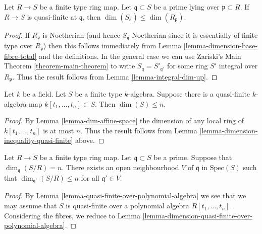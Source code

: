 \begin{lemma}
\label{lemma-dimension-inequality-quasi-finite}
Let $R \to S$ be a finite type ring map.
Let $\mathfrak q \subset S$ be a prime lying over $\mathfrak p \subset R$.
If $R \to S$ is quasi-finite at $\mathfrak q$, then
$\dim(S_{\mathfrak q}) \leq \dim(R_{\mathfrak p})$.
\end{lemma}

\begin{proof}
If $R_{\mathfrak p}$ is Noetherian
(and hence $S_{\mathfrak q}$ Noetherian since it is essentially of
finite type over $R_{\mathfrak p}$)
then this follows immediately from
Lemma \ref{lemma-dimension-base-fibre-total} and the
definitions. In the general case we can use Zariski's Main Theorem
\ref{theorem-main-theorem} to write
$S_{\mathfrak q} = S'_{\mathfrak q'}$ for some
ring $S'$ integral over $R_{\mathfrak p}$.
Thus the result follows from Lemma \ref{lemma-integral-dim-up}.
\end{proof}

\begin{lemma}
\label{lemma-dimension-quasi-finite-over-polynomial-algebra}
Let $k$ be a field. Let $S$ be a finite type $k$-algebra.
Suppose there is a quasi-finite $k$-algebra map
$k[t_1, \ldots, t_n] \subset S$. Then $\dim(S) \leq n$.
\end{lemma}

\begin{proof}
By Lemma \ref{lemma-dim-affine-space} the dimension of
any local ring of $k[t_1, \ldots, t_n]$ is at most $n$.
Thus the result follows from
Lemma \ref{lemma-dimension-inequality-quasi-finite} above.
\end{proof}

\begin{lemma}
\label{lemma-dimension-fibres-bounded-open-upstairs}
Let $R \to S$ be a finite type ring map.
Let $\mathfrak q \subset S$ be a prime.
Suppose that $\dim_{\mathfrak q}(S/R) = n$.
There exists an open neighbourhood $V$ of $\mathfrak q$
in $\text{Spec}(S)$ such that
$\dim_{\mathfrak q'}(S/R) \leq n$ for all $\mathfrak q' \in V$.
\end{lemma}

\begin{proof}
By Lemma \ref{lemma-quasi-finite-over-polynomial-algebra}
we see that we may assume that $S$ is quasi-finite over
a polynomial algebra $R[t_1, \ldots, t_n]$. Considering
the fibres, we reduce to
Lemma \ref{lemma-dimension-quasi-finite-over-polynomial-algebra}.
\end{proof}

